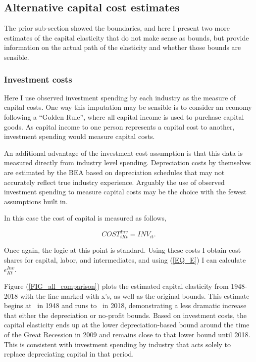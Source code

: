 \documentclass[11pt]{article}
\begin{document}
\subsection{Alternative capital cost estimates}
The prior sub-section showed the boundaries, and here I present two more estimates of the capital elasticity that do not make sense as bounds, but provide information on the actual path of the elasticity and whether those bounds are sensible.

\subsubsection{Investment costs}
Here I use observed investment spending by each industry as the measure of capital costs. One way this imputation may be sensible is to consider an economy following a ``Golden Rule'', where all capital income is used to purchase capital goods. As capital income to one person represents a capital cost to another, investment spending would measure capital costs.

An additional advantage of the investment cost assumption is that this data is measured directly from industry level spending. Depreciation costs by themselves are estimated by the BEA based on depreciation schedules that may not accurately reflect true industry experience. Arguably the use of observed investment spending to measure capital costs may be the choice with the fewest assumptions built in.

In this case the cost of capital is measured as follows,

\begin{equation}
	COST^{Inv}_{iKt} = INV_{it}. 
\end{equation}

Once again, the logic at this point is standard. Using these costs I obtain cost shares for capital, labor, and intermediates, and using (\ref{EQ_E}) I can calculate $\epsilon_{Kt}^{Inv}$. 

Figure (\ref{FIG_all_comparison}) plots the estimated capital elasticity from 1948-2018 with the line marked with x's, as well as the original bounds. This estimate begins at \basefirstinv \ in 1948 and runs to \baselastinv \ in 2018, demonstrating a less dramatic increase that either the depreciation or no-profit bounds. Based on investment costs, the capital elasticity ends up at the lower depreciation-based bound around the time of the Great Recession in 2009 and remains close to that lower bound until 2018. This is consistent with investment spending by industry that acts solely to replace depreciating capital in that period.
\end{document}
